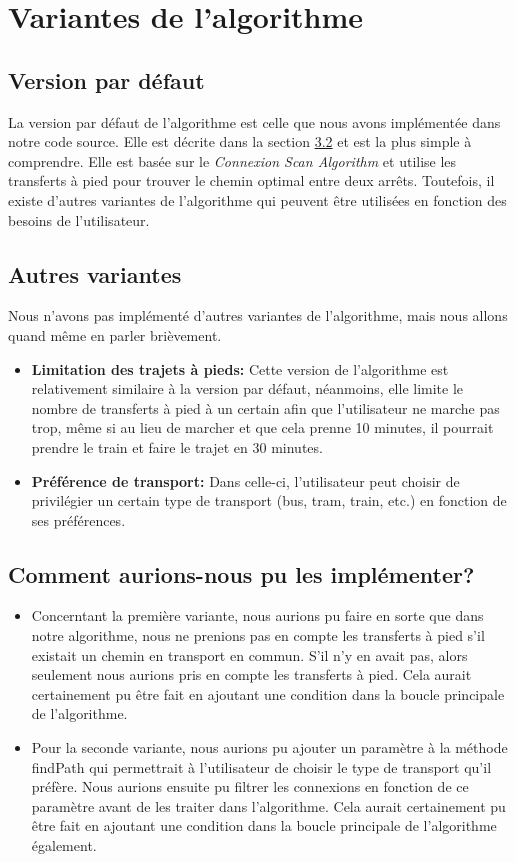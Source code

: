 \documentclass[12pt]{article}
\begin{document}
\section{Variantes de l'algorithme}
\subsection{Version par défaut}
La version par défaut de l'algorithme est celle que nous avons implémentée dans notre code source. Elle est décrite dans la section \hyperref[sec:algorithme]{3.2} et
est la plus simple à comprendre. Elle est basée sur le \emph{Connexion Scan Algorithm} et utilise les transferts à pied pour trouver le chemin optimal entre deux arrêts.
Toutefois,  il existe d'autres variantes de l'algorithme qui peuvent être utilisées en fonction des besoins de l'utilisateur.
\subsection{Autres variantes}
Nous n'avons pas implémenté d'autres variantes de l'algorithme, mais nous allons quand même en parler brièvement.
\begin{itemize}
  \item \textbf{Limitation des trajets à pieds:} Cette version de l'algorithme est relativement similaire à la version par défaut, néanmoins, elle limite le nombre de transferts à pied à un certain
  afin que l'utilisateur ne marche pas trop, même si au lieu de marcher et que cela prenne 10 minutes, il pourrait prendre le train et faire le trajet en 30 minutes. 
  \item \textbf{Préférence de transport:} Dans celle-ci, l'utilisateur peut choisir de privilégier un certain type de transport (bus, tram, train, etc.) en fonction de ses préférences.
\end{itemize}

\subsection{Comment aurions-nous pu les implémenter?}
\begin{itemize}
  \item Concerntant la première variante, nous aurions pu faire en sorte que dans notre algorithme, nous ne prenions pas en compte les transferts à pied s'il existait un chemin en transport en commun.
  S'il n'y en avait pas, alors seulement nous aurions pris en compte les transferts à pied. Cela aurait certainement pu être fait en ajoutant une condition dans la boucle principale de l'algorithme.
  \item Pour la seconde variante, nous aurions pu ajouter un paramètre à la méthode findPath qui permettrait à l'utilisateur de choisir le type de transport qu'il préfère.
  Nous aurions ensuite pu filtrer les connexions en fonction de ce paramètre avant de les traiter dans l'algorithme. Cela aurait certainement pu être fait en ajoutant une condition dans la boucle principale de l'algorithme également.
\end{itemize}
\end{document}
